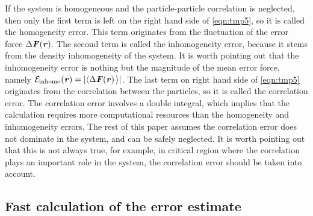 \documentclass[preprint]{revtex4}
\renewcommand{\v}[1]{\textbf{\textit{#1}}}
\begin{document}
If the system is homogeneous and the particle-particle correlation is
neglected, then only the first term is left on the right hand side of \eqref{eqn:tmp5}, so it
is called the homogeneity error.  This term originates from the
fluctuation of the error force $\Delta\v F(\v r)$.  The second term is
called the inhomogeneity error, because it stems from the density
inhomogeneity of the system. It is worth pointing out that the
inhomogeneity error is nothing but the magnitude of the mean error force,
namely $\mathcal E_{\textrm{inhomo}}(\v r) = \vert\langle\Delta\v F(\v
r)\,\rangle\vert$.  The last term on right hand side of \eqref{eqn:tmp5} originates from the
correlation between the particles, so it is called the correlation
error.
The correlation error involves a double integral, which
implies that the calculation  requires more computational resources
than the homogeneity and inhomogeneity errors.
The rest of this paper
assumes the 
correlation error does not dominate in the system, and can be safely
neglected.
It is worth pointing out that this is not always true, for example, in
critical region where the correlation plays an important role in the system,
the correlation error should be taken into account.


\subsection{Fast calculation of the error estimate}\label{sec:tmp1.3}
\end{document}
